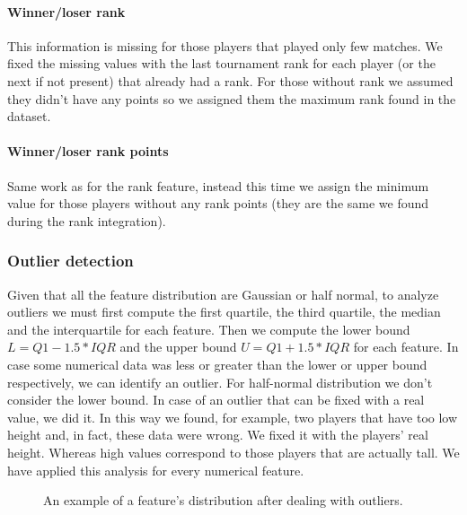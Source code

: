 \paragraph{Winner/loser rank} This information is missing for those players that played only few matches. We fixed the missing values with the last tournament rank for each player (or the next if not present) that already had a rank. For those without rank we assumed they didn't have any points so we assigned them the maximum rank found in the dataset.

\paragraph{Winner/loser rank points} Same work as for the rank feature, instead this time we assign the minimum value for those players without any rank points (they are the same we found during the rank integration).

\subsubsection{Outlier detection}
Given that all the feature distribution are Gaussian or half normal, to analyze outliers we must first compute the first quartile, the third quartile, the median and the interquartile for each feature. Then we compute the lower bound $L=Q1 - 1.5 * IQR$ and the upper bound $U=Q1 + 1.5 * IQR$ for each feature. In case some numerical data was less or greater than the lower or upper bound respectively, we can identify an outlier. For half-normal distribution we don't consider the lower bound. In case of an outlier that can be fixed with a real value, we did it. In this way we found, for example, two players that have too low height and, in fact, these data were wrong. We fixed it with the players' real height. Whereas high values correspond to those players that are actually tall. We have applied this analysis for every numerical feature.
\begin{figure}[H]
    \centering
    \caption{An example of a feature's distribution after dealing with outliers.}
    \label{fig:before_and_after_detection}
\end{figure}

